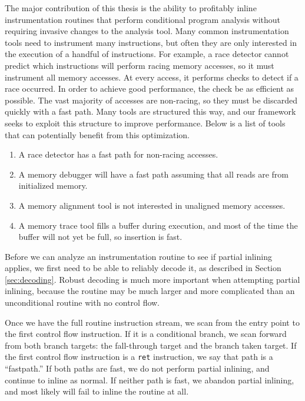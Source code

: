 The major contribution of this thesis is the ability to profitably inline
instrumentation routines that perform conditional program analysis without
requiring invasive changes to the analysis tool.  Many common instrumentation
tools need to instrument many instructions, but often they are only interested
in the execution of a handful of instructions.  For example, a race detector
cannot predict which instructions will perform racing memory accesses, so it
must instrument all memory accesses.  At every access, it performs checks to
detect if a race occurred.  In order to achieve good performance, the check be
as efficient as possible.  The vast majority of accesses are non-racing, so they
must be discarded quickly with a fast path.  Many tools are structured this way,
and our framework seeks to exploit this structure to improve performance.  Below
is a list of tools that can potentially benefit from this optimization.

\begin{enumerate}
\item A race detector has a fast path for non-racing accesses.
\item A memory debugger will have a fast path assuming that all reads are from
initialized memory.
\item A memory alignment tool is not interested in unaligned memory accesses.
\item A memory trace tool fills a buffer during execution, and most of the time
the buffer will not yet be full, so insertion is fast.
\end{enumerate}

Before we can analyze an instrumentation routine to see if partial inlining
applies, we first need to be able to reliably decode it, as described in Section
\ref{sec:decoding}.  Robust decoding is much more important when attempting
partial inlining, because the routine may be much larger and more complicated
than an unconditional routine with no control flow.

Once we have the full routine instruction stream, we scan from the entry point
to the first control flow instruction.  If it is a conditional branch, we scan
forward from both branch targets: the fall-through target and the branch taken
target.  If the first control flow instruction is a {\tt ret} instruction, we
say that path is a ``fastpath.''  If both paths are fast, we do not perform
partial inlining, and continue to inline as normal.  If neither path is fast, we
abandon partial inlining, and most likely will fail to inline the routine at
all.

